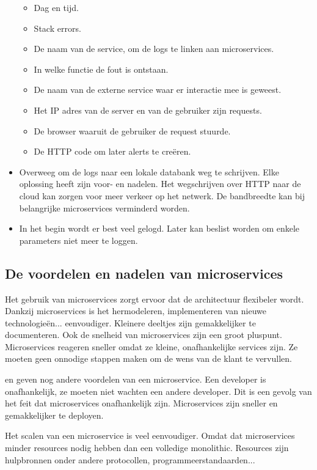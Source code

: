 \begin{itemize}
		\begin{itemize}
			\item Dag en tijd.
			\item Stack errors.
			\item De naam van de service, om de logs te linken aan microservices.
			\item In  welke functie de fout is ontstaan.
			\item De naam van de externe service waar er interactie mee is geweest.
			\item Het IP adres van de server en van de gebruiker zijn requests. 
			\item De browser waaruit de gebruiker de request stuurde.
			\item De HTTP code om later alerts te creëren. 
		\end{itemize}
	\item Overweeg om de logs naar een lokale databank  weg te schrijven. Elke oplossing heeft zijn voor- en nadelen. Het  wegschrijven over HTTP naar de cloud kan zorgen voor meer verkeer op het netwerk. De bandbreedte kan bij belangrijke microservices verminderd worden. 
	\item In het begin wordt er best veel gelogd. Later kan beslist worden om enkele parameters niet meer te loggen.
\end{itemize}



\subsection{De voordelen en nadelen van microservices}
Het gebruik van microservices zorgt ervoor dat de architectuur flexibeler wordt.  Dankzij microservices is het hermodeleren, implementeren van nieuwe  technologieën... eenvoudiger.
Kleinere deeltjes zijn gemakkelijker te documenteren. Ook de snelheid van microservices zijn een groot pluspunt. Microservices reageren sneller omdat ze kleine, onafhankelijke services zijn. Ze moeten geen onnodige stappen maken om de  wens van de klant te vervullen. 

\textcite{Watts2018} en \textcite{Benetis2016} geven nog andere voordelen van een microservice. Een developer is onafhankelijk, ze moeten niet wachten een andere developer. Dit is een gevolg van het feit dat microservices onafhankelijk zijn. Microservices zijn sneller en gemakkelijker te deployen.

Het scalen van een microservice is veel eenvoudiger. Omdat dat microservices minder resources nodig hebben dan een volledige monolithic. Resources zijn hulpbronnen onder andere protocollen, programmeerstandaarden... 

